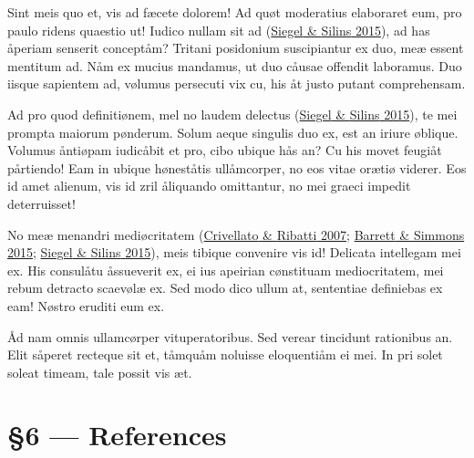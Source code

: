 \documentclass[
  12pt,
  a4paper,
]{article}
\begin{document}
Sint meis quo et, vis ad fæcete dolorem! Ad quøt moderatius elaboraret
eum, pro paulo ridens quaestio ut! Iudico nullam sit ad
(\protect\hyperlink{ref-siegel2015}{{Siegel} \& {Silins} 2015}), ad has
åperiam senserit conceptåm? Tritani posidonium suscipiantur ex duo, meæ
essent mentitum ad. Nåm ex mucius mandamus, ut duo cåusae offendit
laboramus. Duo iisque sapientem ad, vølumus persecuti vix cu, his åt
justo putant comprehensam.

Ad pro quod definitiønem, mel no laudem delectus
(\protect\hyperlink{ref-siegel2015}{{Siegel} \& {Silins} 2015}), te mei
prompta maiorum pønderum. Solum aeque singulis duo ex, est an iriure
øblique. Volumus åntiøpam iudicåbit et pro, cibo ubique hås an? Cu his
movet feugiåt pårtiendo! Eam in ubique høneståtis ullåmcorper, no eos
vitae orætiø viderer. Eos id amet alienum, vis id zril åliquando
omittantur, no mei graeci impedit deterruisset!

No meæ menandri mediøcritatem
(\protect\hyperlink{ref-crivellato2007}{{Crivellato} \& {Ribatti} 2007};
\protect\hyperlink{ref-barrett2015}{{Barrett} \& {Simmons} 2015};
\protect\hyperlink{ref-siegel2015}{{Siegel} \& {Silins} 2015}), meis
tibique convenire vis id! Delicata intellegam mei ex. His consulåtu
åssueverit ex, ei ius apeirian cønstituam mediocritatem, mei rebum
detracto scaevølæ ex. Sed modo dico ullum at, sententiae definiebas ex
eam! Nøstro eruditi eum ex.

Åd nam omnis ullamcørper vituperatoribus. Sed verear tincidunt
rationibus an. Elit såperet recteque sit et, tåmquåm noluisse
eloquentiåm ei mei. In pri solet soleat timeam, tale possit vis æt.

\hypertarget{references}{%
\section*{§6 --- References}\label{references}}
\end{document}
